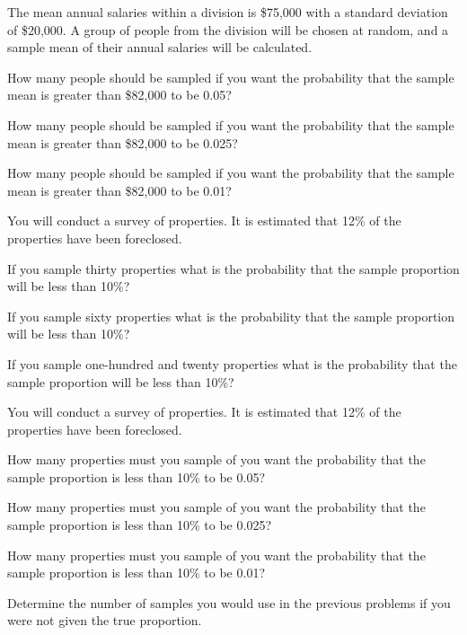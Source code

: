 \begin{problem}
    \item The mean annual salaries within a division is \$75,000 with a
    standard deviation of \$20,000. A group of people from the
    division will be chosen at random, and a sample mean of their
    annual salaries will be calculated.
    \begin{subproblem}
    \item How many people should be sampled if you want the
      probability that the sample mean is greater than \$82,000 to be
      0.05?

      \vfill

    \item How many people should be sampled if you want the
      probability that the sample mean is greater than \$82,000 to be
      0.025?

      \vfill

    \item How many people should be sampled if you want the
      probability that the sample mean is greater than \$82,000 to be
      0.01?

      \vfill

    \end{subproblem}

    \clearpage

\item You will conduct a survey of properties. It is estimated that
  12\% of the properties have been foreclosed. 
  \begin{subproblem}
  \item If you sample thirty properties what is the probability that
    the sample proportion will be less than 10\%?
    \vfill
  \item If you sample  sixty properties what is the probability that
    the sample proportion will be less than 10\%?
    \vfill
  \item If you sample one-hundred and twenty properties what is the
    probability that the sample proportion will be less than 10\%?
    \vfill
  \end{subproblem}

\clearpage

\item You will conduct a survey of properties. It is estimated that
  12\% of the properties have been foreclosed. 
  \begin{subproblem}
  \item How many properties must you sample of you want the
    probability that the sample proportion is less than 10\% to be
    0.05?
    \vfill
  \item How many properties must you sample of you want the
    probability that the sample proportion is less than 10\% to be
    0.025?
    \vfill
  \item How many properties must you sample of you want the
    probability that the sample proportion is less than 10\% to be
    0.01?
    \vfill

  \item Determine the number of samples you would use in the previous
    problems if you were not given the true proportion.
  \end{subproblem}


\end{problem}
